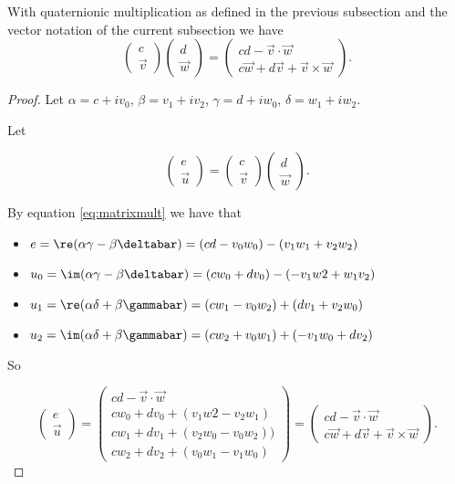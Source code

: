 \documentclass[oneside,12pt]{amsart}
\begin{document}
\begin{lemma}
\label{lemma:in_terms_of_vector_products}
With quaternionic multiplication as defined in the previous subsection and the vector notation of the current subsection we have
$$
\begin{pmatrix}
c\\
\vec{v}
\end{pmatrix}
\begin{pmatrix}
d\\
\vec{w}
\end{pmatrix}
=
\begin{pmatrix}
cd - \vec{v} \cdot \vec{w} \\
c\vec{w} + d\vec{v} + \vec{v}\times \vec{w}
\end{pmatrix}.
$$
\end{lemma}
\begin{proof}
Let $\alpha = c + iv_0$, $\beta = v_1 + i v_2$,
$\gamma = d + iw_0$, $\delta = w_1 + iw_2$.

Let 

$$
\begin{pmatrix}
e\\
\vec{u}
\end{pmatrix}
=
\begin{pmatrix}
c\\
\vec{v}
\end{pmatrix}
\begin{pmatrix}
d\\
\vec{w}
\end{pmatrix}.
$$

By equation \ref{eq:matrixmult} we have that
\begin{itemize}
\item $e=\re(\alpha\gamma - \beta\deltabar) = (cd -v_0 w_0) - (v_1 w_1 + v_2 w_2)$
\item $u_0 = \im(\alpha\gamma - \beta\deltabar) = (c w_0 + d v_0) - (- v_1 w2 + w_1 v_2)$
\item $u_1 = \re(\alpha\delta + \beta\gammabar) = (c w_1 - v_0 w_2) + (d v_1 + v_2 w_0)$
\item $u_2 = \im(\alpha\delta + \beta\gammabar) = (c w_2 + v_0 w_1) + (-v_1 w_0 + d v_2)$
\end{itemize}

So

$$
\begin{pmatrix}
e\\
\vec{u}
\end{pmatrix}
=
\begin{pmatrix}
cd - \vec{v} \cdot \vec{w} \\
c w_0 + d v_0 + ( v_1 w2 -  v_2 w_1) \\
c w_1 + d v_1 + (v_2 w_0 - v_0 w_2))\\
c w_2 + d v_2 + (v_0 w_1 - v_1 w_0)
\end{pmatrix}
=
\begin{pmatrix}
cd - \vec{v} \cdot \vec{w} \\
c\vec{w} + d\vec{v} + \vec{v}\times \vec{w}
\end{pmatrix}.
$$
\end{proof}
\end{document}
